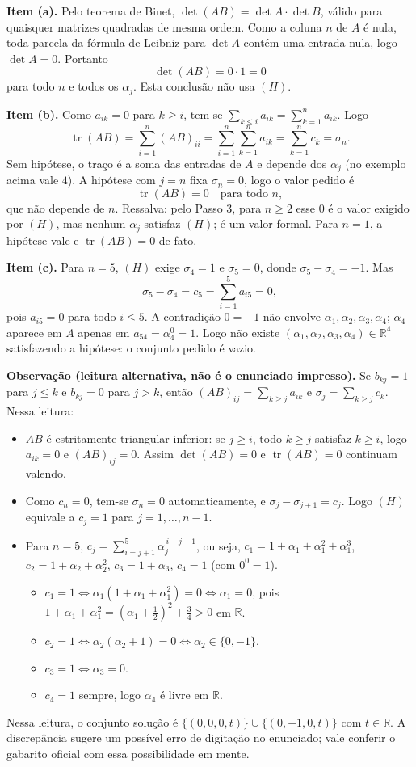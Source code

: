 \documentclass{article}%
\begin{document}
\textbf{Item (a).} Pelo teorema de Binet, $\det(AB)=\det A\cdot\det B$, válido para quaisquer matrizes quadradas de mesma ordem. Como a coluna $n$ de $A$ é nula, toda parcela da fórmula de Leibniz para $\det A$ contém uma entrada nula, logo $\det A=0$. Portanto
\[
\det(AB)=0\cdot 1=0
\]
para todo $n$ e todos os $\alpha_j$. Esta conclusão não usa $(H)$.

\textbf{Item (b).} Como $a_{ik}=0$ para $k\ge i$, tem-se $\sum_{k\le i}a_{ik}=\sum_{k=1}^{n}a_{ik}$. Logo
\[
\operatorname{tr}(AB)=\sum_{i=1}^{n}(AB)_{ii}=\sum_{i=1}^{n}\sum_{k=1}^{n}a_{ik}=\sum_{k=1}^{n}c_k=\sigma_n .
\]
Sem hipótese, o traço é a soma das entradas de $A$ e depende dos $\alpha_j$ (no exemplo acima vale $4$). A hipótese com $j=n$ fixa $\sigma_n=0$, logo o valor pedido é
\[
\operatorname{tr}(AB)=0 \quad\text{para todo } n,
\]
que não depende de $n$. Ressalva: pelo Passo 3, para $n\ge 2$ esse $0$ é o valor exigido por $(H)$, mas nenhum $\alpha_j$ satisfaz $(H)$; é um valor formal. Para $n=1$, a hipótese vale e $\operatorname{tr}(AB)=0$ de fato.

\textbf{Item (c).} Para $n=5$, $(H)$ exige $\sigma_4=1$ e $\sigma_5=0$, donde $\sigma_5-\sigma_4=-1$. Mas
\[
\sigma_5-\sigma_4=c_5=\sum_{i=1}^{5}a_{i5}=0,
\]
pois $a_{i5}=0$ para todo $i\le 5$. A contradição $0=-1$ não envolve $\alpha_1,\alpha_2,\alpha_3,\alpha_4$; $\alpha_4$ aparece em $A$ apenas em $a_{54}=\alpha_4^{0}=1$. Logo não existe $(\alpha_1,\alpha_2,\alpha_3,\alpha_4)\in\mathbb{R}^4$ satisfazendo a hipótese: o conjunto pedido é vazio.

\textbf{Observação (leitura alternativa, não é o enunciado impresso).} Se $b_{kj}=1$ para $j\le k$ e $b_{kj}=0$ para $j>k$, então $(AB)_{ij}=\sum_{k\ge j}a_{ik}$ e $\sigma_j=\sum_{k\ge j}c_k$. Nessa leitura:
\begin{itemize}
\item $AB$ é estritamente triangular inferior: se $j\ge i$, todo $k\ge j$ satisfaz $k\ge i$, logo $a_{ik}=0$ e $(AB)_{ij}=0$. Assim $\det(AB)=0$ e $\operatorname{tr}(AB)=0$ continuam valendo.
\item Como $c_n=0$, tem-se $\sigma_n=0$ automaticamente, e $\sigma_j-\sigma_{j+1}=c_j$. Logo $(H)$ equivale a $c_j=1$ para $j=1,\dots,n-1$.
\item Para $n=5$, $c_j=\sum_{i=j+1}^{5}\alpha_j^{\,i-j-1}$, ou seja, $c_1=1+\alpha_1+\alpha_1^2+\alpha_1^3$, $c_2=1+\alpha_2+\alpha_2^2$, $c_3=1+\alpha_3$, $c_4=1$ (com $0^0=1$).
\begin{itemize}
\item $c_1=1\iff\alpha_1(1+\alpha_1+\alpha_1^2)=0\iff\alpha_1=0$, pois $1+\alpha_1+\alpha_1^2=\left(\alpha_1+\tfrac{1}{2}\right)^2+\tfrac{3}{4}>0$ em $\mathbb{R}$.
\item $c_2=1\iff\alpha_2(\alpha_2+1)=0\iff\alpha_2\in\{0,-1\}$.
\item $c_3=1\iff\alpha_3=0$.
\item $c_4=1$ sempre, logo $\alpha_4$ é livre em $\mathbb{R}$.
\end{itemize}
\end{itemize}
Nessa leitura, o conjunto solução é $\{(0,0,0,t)\}\cup\{(0,-1,0,t)\}$ com $t\in\mathbb{R}$. A discrepância sugere um possível erro de digitação no enunciado; vale conferir o gabarito oficial com essa possibilidade em mente.
\end{document}
